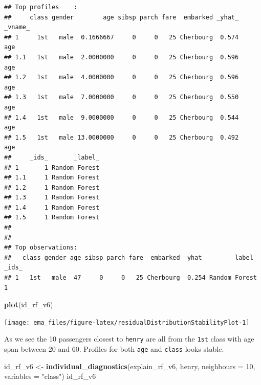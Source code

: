 \documentclass[]{krantz}
\newenvironment{Shaded}{\begin{snugshade}}{\end{snugshade}}
\newcommand{\DataTypeTok}[1]{\textcolor[rgb]{0.13,0.29,0.53}{#1}}
\newcommand{\DecValTok}[1]{\textcolor[rgb]{0.00,0.00,0.81}{#1}}
\newcommand{\KeywordTok}[1]{\textcolor[rgb]{0.13,0.29,0.53}{\textbf{#1}}}
\newcommand{\NormalTok}[1]{#1}
\newcommand{\StringTok}[1]{\textcolor[rgb]{0.31,0.60,0.02}{#1}}
\begin{document}
\begin{verbatim}
## Top profiles    : 
##     class gender        age sibsp parch fare  embarked _yhat_ _vname_
## 1     1st   male  0.1666667     0     0   25 Cherbourg  0.574     age
## 1.1   1st   male  2.0000000     0     0   25 Cherbourg  0.596     age
## 1.2   1st   male  4.0000000     0     0   25 Cherbourg  0.596     age
## 1.3   1st   male  7.0000000     0     0   25 Cherbourg  0.550     age
## 1.4   1st   male  9.0000000     0     0   25 Cherbourg  0.544     age
## 1.5   1st   male 13.0000000     0     0   25 Cherbourg  0.492     age
##     _ids_       _label_
## 1       1 Random Forest
## 1.1     1 Random Forest
## 1.2     1 Random Forest
## 1.3     1 Random Forest
## 1.4     1 Random Forest
## 1.5     1 Random Forest
## 
## 
## Top observations:
##   class gender age sibsp parch fare  embarked _yhat_       _label_ _ids_
## 1   1st   male  47     0     0   25 Cherbourg  0.254 Random Forest     1
\end{verbatim}

\begin{Shaded}
\begin{Highlighting}[]
\KeywordTok{plot}\NormalTok{(id_rf_v6)}
\end{Highlighting}
\end{Shaded}

\begin{center}\texttt{[image: ema\_files/figure-latex/residualDistributionStabilityPlot-1]} \end{center}

As we see the 10 passengers closest to \texttt{henry} are all from the \texttt{1st} class with age span between 20 and 60. Profiles for both \texttt{age} and \texttt{class} looks stable.

\begin{Shaded}
\begin{Highlighting}[]
\NormalTok{id_rf_v6 <-}\StringTok{ }\KeywordTok{individual_diagnostics}\NormalTok{(explain_rf_v6,}
\NormalTok{                          henry, }
                       \DataTypeTok{neighbours =} \DecValTok{10}\NormalTok{,}
                       \DataTypeTok{variables =} \StringTok{"class"}\NormalTok{)}
\NormalTok{id_rf_v6}
\end{Highlighting}
\end{Shaded}
\end{document}
